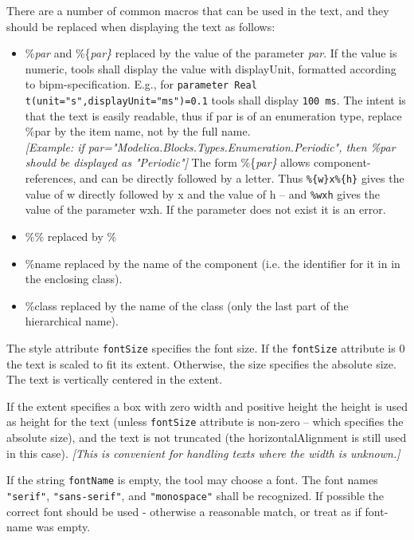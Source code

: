 There are a number of common macros that can be used in the text, and
they should be replaced when displaying the text as follows:

\begin{itemize}
\item
  \%\emph{par} and \%\{\emph{par\}} replaced by the value of the
  parameter \emph{par}.
  If the value is numeric, tools shall display the value with displayUnit, formatted according to bipm-specification.
  E.g., for \lstinline!parameter Real t(unit="s",displayUnit="ms")=0.1! tools shall display \lstinline!100 ms!.
  The intent is that the text is easily readable,
  thus if par is of an enumeration type, replace \%par by the item name,
  not by the full name.\\
  \emph{{[}Example: if par="Modelica.Blocks.Types.Enumeration.Periodic",
  then \%par should be displayed as "Periodic"{]}} The form
  \%\{\emph{par\}} allows component-references, and can be directly
  followed by a letter. Thus \lstinline!%{w}x%{h}! gives the value of w
  directly followed by x and the value of h -- and \lstinline!%wxh! gives the value of the
  parameter wxh. If the parameter does not exist it is an error.
\item
  \%\% replaced by \%
\item
  \%name replaced by the name of the component (i.e. the identifier for
  it in in the enclosing class).
\item
  \%class replaced by the name of the class (only the last part of the hierarchical name).
\end{itemize}

The style attribute \lstinline!fontSize! specifies the font size. If the \lstinline!fontSize!
attribute is 0 the text is scaled to fit its extent. Otherwise, the size
specifies the absolute size. The text is vertically centered in the
extent.

If the extent specifies a box with zero width and positive height the
height is used as height for the text (unless \lstinline!fontSize! attribute is
non-zero -- which specifies the absolute size), and the text is not
truncated (the horizontalAlignment is still used in this case).
\emph{{[}This is convenient for handling texts where the width is
unknown.{]}}

If the string \lstinline!fontName! is empty, the tool may choose a font. The font
names \lstinline!"serif"!, \lstinline!"sans-serif"!, and \lstinline!"monospace"! shall be recognized. If
possible the correct font should be used - otherwise a reasonable match,
or treat as if font-name was empty.

